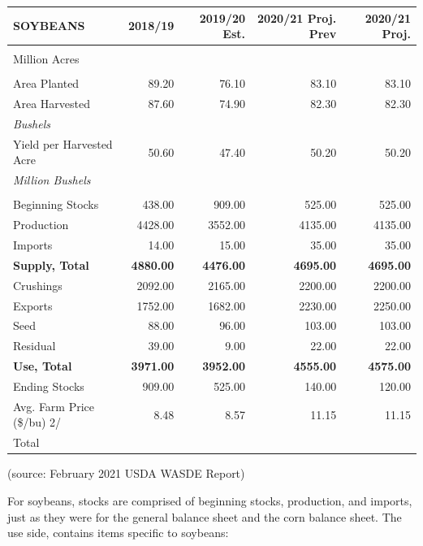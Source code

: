 \documentclass[
  letterpaper,
  DIV=11,
  numbers=noendperiod]{scrreprt}
\begin{document}
\begin{table}
\centering
\begin{tabular}{l|r|r|r|r}
\hline
SOYBEANS & 2018/19 & 2019/20 Est. & 2020/21 Proj. Prev & 2020/21 Proj.\\
\hline
\textbf{} & \textbf{} & \textbf{} & \textbf{ \vphantom{2}} & \textbf{}\\
\hline
Million Acres &  &  &  \vphantom{1} & \\
\hline
 &  &  &  & \\
\hline
Area Planted & 89.20 & 76.10 & 83.10 & 83.10\\
\hline
Area Harvested & 87.60 & 74.90 & 82.30 & 82.30\\
\hline
\em{Bushels} & \em{} & \em{} & \em{} & \em{}\\
\hline
Yield per Harvested Acre & 50.60 & 47.40 & 50.20 & 50.20\\
\hline
\em{Million Bushels} & \em{} & \em{} & \em{} & \em{}\\
\hline
 &  &  &  & \\
\hline
Beginning Stocks & 438.00 & 909.00 & 525.00 & 525.00\\
\hline
Production & 4428.00 & 3552.00 & 4135.00 & 4135.00\\
\hline
Imports & 14.00 & 15.00 & 35.00 & 35.00\\
\hline
\textbf{Supply, Total} & \textbf{4880.00} & \textbf{4476.00} & \textbf{4695.00} & \textbf{4695.00}\\
\hline
Crushings & 2092.00 & 2165.00 & 2200.00 & 2200.00\\
\hline
Exports & 1752.00 & 1682.00 & 2230.00 & 2250.00\\
\hline
Seed & 88.00 & 96.00 & 103.00 & 103.00\\
\hline
Residual & 39.00 & 9.00 & 22.00 & 22.00\\
\hline
\textbf{Use, Total} & \textbf{3971.00} & \textbf{3952.00} & \textbf{4555.00} & \textbf{4575.00}\\
\hline
Ending Stocks & 909.00 & 525.00 & 140.00 & 120.00\\
\hline
Avg. Farm Price (\$/bu)  2/ & 8.48 & 8.57 & 11.15 & 11.15\\
\hline
Total &  &  &  & \\
\hline
\end{tabular}
\end{table}

(source: February 2021 USDA WASDE Report)

For soybeans, stocks are comprised of beginning stocks, production, and
imports, just as they were for the general balance sheet and the corn
balance sheet. The use side, contains items specific to soybeans:
\end{document}
